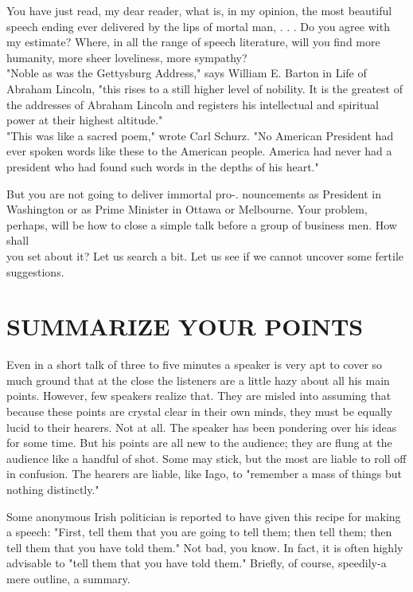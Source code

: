 \documentclass[10pt]{article}
\begin{document}
You have just read, my dear reader, what is, in my opinion, the most beautiful speech ending ever delivered by the lips of mortal man, . . . Do you agree with my estimate? Where, in all the range of speech literature, will you find more humanity, more sheer loveliness, more sympathy?\\
"Noble as was the Gettysburg Address," says William E. Barton in Life of Abraham Lincoln, "this rises to a still higher level of nobility. It is the greatest of the addresses of Abraham Lincoln and registers his intellectual and spiritual power at their highest altitude."\\
"This was like a sacred poem," wrote Carl Schurz. "No American President had ever spoken words like these to the American people. America had never had a president who had found such words in the depths of his heart."

But you are not going to deliver immortal pro-. nouncements as President in Washington or as Prime Minister in Ottawa or Melbourne. Your problem, perhaps, will be how to close a simple talk before a group of business men. How shall\\
you set about it? Let us search a bit. Let us see if we cannot uncover some fertile suggestions.

\section*{SUMMARIZE YOUR POINTS}
Even in a short talk of three to five minutes a speaker is very apt to cover so much ground that at the close the listeners are a little hazy about all his main points. However, few speakers realize that. They are misled into assuming that because these points are crystal clear in their own minds, they must be equally lucid to their hearers. Not at all. The speaker has been pondering over his ideas for some time. But his points are all new to the audience; they are flung at the audience like a handful of shot. Some may stick, but the most are liable to roll off in confusion. The hearers are liable, like Iago, to "remember a mass of things but nothing distinctly."

Some anonymous Irish politician is reported to have given this recipe for making a speech: "First, tell them that you are going to tell them; then tell them; then tell them that you have told them." Not bad, you know. In fact, it is often highly advisable to "tell them that you have told them." Briefly, of course, speedily-a mere outline, a summary.
\end{document}
